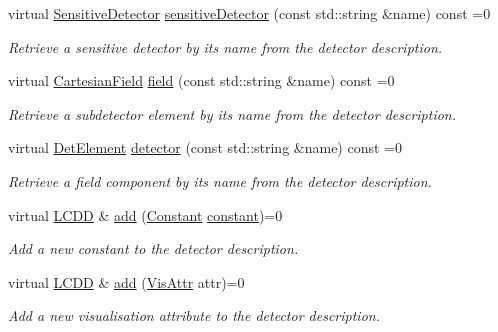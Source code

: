 \begin{DoxyCompactItemize}
virtual \hyperlink{class_d_d4hep_1_1_geometry_1_1_sensitive_detector}{Sensitive\+Detector} \hyperlink{class_d_d4hep_1_1_geometry_1_1_l_c_d_d_af476b8241b93e82350ec1e5cbf145941}{sensitive\+Detector} (const std\+::string \&name) const =0
\begin{DoxyCompactList}\small\item\em Retrieve a sensitive detector by it\textquotesingle{}s name from the detector description. \end{DoxyCompactList}\item 
virtual \hyperlink{class_d_d4hep_1_1_geometry_1_1_cartesian_field}{Cartesian\+Field} \hyperlink{class_d_d4hep_1_1_geometry_1_1_l_c_d_d_adcc7929860f5ac592d8f4c2d476555e9}{field} (const std\+::string \&name) const =0
\begin{DoxyCompactList}\small\item\em Retrieve a subdetector element by it\textquotesingle{}s name from the detector description. \end{DoxyCompactList}\item 
virtual \hyperlink{class_d_d4hep_1_1_geometry_1_1_det_element}{Det\+Element} \hyperlink{class_d_d4hep_1_1_geometry_1_1_l_c_d_d_a0ed0c4e5d72a1e07ce11cf2592d6de3e}{detector} (const std\+::string \&name) const =0
\begin{DoxyCompactList}\small\item\em Retrieve a field component by it\textquotesingle{}s name from the detector description. \end{DoxyCompactList}\item 
virtual \hyperlink{class_d_d4hep_1_1_geometry_1_1_l_c_d_d}{L\+C\+DD} \& \hyperlink{class_d_d4hep_1_1_geometry_1_1_l_c_d_d_a438cd36346d10c381b99bdfaa80ba50e}{add} (\hyperlink{class_d_d4hep_1_1_geometry_1_1_constant}{Constant} \hyperlink{class_d_d4hep_1_1_geometry_1_1_l_c_d_d_a7c7e23e0ff875bf83493430bfaeb77c4}{constant})=0
\begin{DoxyCompactList}\small\item\em Add a new constant to the detector description. \end{DoxyCompactList}\item 
virtual \hyperlink{class_d_d4hep_1_1_geometry_1_1_l_c_d_d}{L\+C\+DD} \& \hyperlink{class_d_d4hep_1_1_geometry_1_1_l_c_d_d_a4913f783de23fed9eb9dc11678226aa8}{add} (\hyperlink{class_d_d4hep_1_1_geometry_1_1_vis_attr}{Vis\+Attr} attr)=0
\begin{DoxyCompactList}\small\item\em Add a new visualisation attribute to the detector description. \end{DoxyCompactList}\item 

\end{DoxyCompactItemize}
